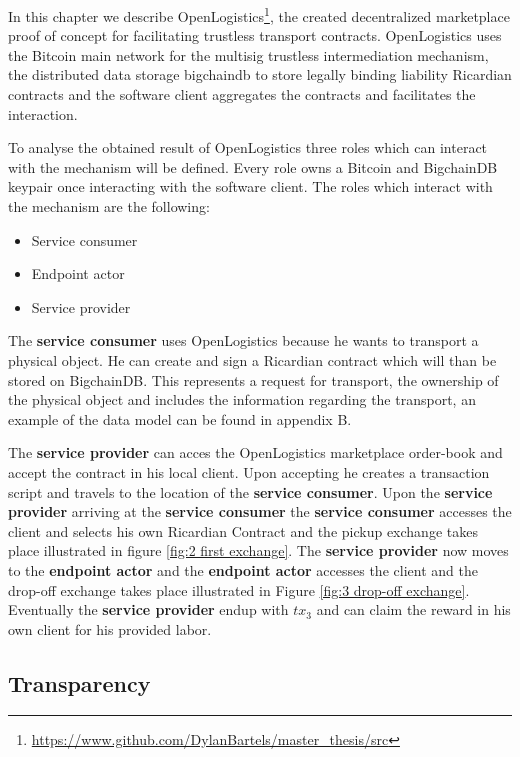 In this chapter we describe OpenLogistics\footnote{\url{https://www.github.com/DylanBartels/master_thesis/src}}, the created decentralized marketplace proof of concept for facilitating trustless transport contracts. OpenLogistics uses the Bitcoin main network for the multisig trustless intermediation mechanism, the distributed data storage bigchaindb to store legally binding liability Ricardian contracts and the software client aggregates the contracts and facilitates the interaction. \par
To analyse the obtained result of OpenLogistics three roles which can interact with the mechanism will be defined. Every role owns a Bitcoin and BigchainDB keypair once interacting with the software client. The roles which interact with the mechanism are the following:
\begin{itemize}
  \item Service consumer
  \item Endpoint actor
  \item Service provider
\end{itemize}
The \textbf{service consumer} uses OpenLogistics because he wants to transport a physical object. He can create and sign a Ricardian contract which will than be stored on BigchainDB. This represents a request for transport, the ownership of the physical object and includes the information regarding the transport, an example of the data model can be found in appendix B. \par

The \textbf{service provider} can acces the OpenLogistics marketplace order-book and accept the contract in his local client. Upon accepting he creates a transaction script and travels to the location of the \textbf{service consumer}. Upon the \textbf{service provider} arriving at the \textbf{service consumer} the \textbf{service consumer} accesses the client and selects his own Ricardian Contract and the pickup exchange takes place illustrated in figure \ref{fig:2 first exchange}. The \textbf{service provider} now moves to the \textbf{endpoint actor} and the \textbf{endpoint actor} accesses the client and the drop-off exchange takes place illustrated in Figure \ref{fig:3 drop-off exchange}. Eventually the \textbf{service provider} endup with $tx_3$ and can claim the reward in his own client for his provided labor. \par

\subsection{Transparency}

